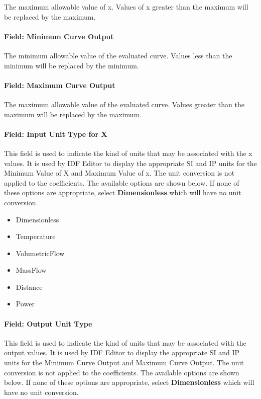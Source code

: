 The maximum allowable value of x. Values of x greater than the maximum will be replaced by the maximum.

\paragraph{Field: Minimum Curve Output}\label{field-minimum-curve-output-1}

The minimum allowable value of the evaluated curve. Values less than the minimum will be replaced by the minimum.

\paragraph{Field: Maximum Curve Output}\label{field-maximum-curve-output-1}

The maximum allowable value of the evaluated curve. Values greater than the maximum will be replaced by the maximum.

\paragraph{Field: Input Unit Type for X}\label{field-input-unit-type-for-x-2}

This field is used to indicate the kind of units that may be associated with the x values. It is used by IDF Editor to display the appropriate SI and IP units for the Minimum Value of X and Maximum Value of x. The unit conversion is not applied to the coefficients. The available options are shown below. If none of these options are appropriate, select \textbf{Dimensionless} which will have no unit conversion.

\begin{itemize}
\item
  Dimensionless
\item
  Temperature
\item
  VolumetricFlow
\item
  MassFlow
\item
  Distance
\item
  Power
\end{itemize}

\paragraph{Field: Output Unit Type}\label{field-output-unit-type-1}

This field is used to indicate the kind of units that may be associated with the output values. It is used by IDF Editor to display the appropriate SI and IP units for the Minimum Curve Output and Maximum Curve Output. The unit conversion is not applied to the coefficients. The available options are shown below. If none of these options are appropriate, select \textbf{Dimensionless} which will have no unit conversion.

